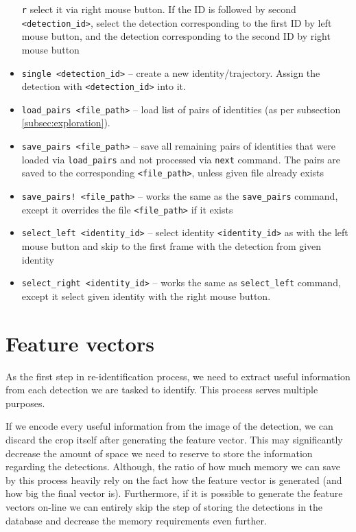 \begin{itemize}
    \verb+r+ select it via right mouse button. If the ID is followed by second
    \verb+<detection_id>+, select the detection corresponding to the first ID by left
    mouse button, and the detection corresponding to the second ID by right mouse button
    \item \verb+single <detection_id>+ -- create a new identity/trajectory. Assign the
    detection with \verb+<detection_id>+ into it.
    \item \verb+load_pairs <file_path>+ -- load list of pairs of identities (as per subsection \ref{subsec:exploration}). 
    \item \verb+save_pairs <file_path>+ -- save all remaining pairs of identities that were loaded via \verb+load_pairs+ and not processed via \verb+next+ command. The
    pairs are saved to the corresponding \verb+<file_path>+, unless given file already
    exists
    \item \verb+save_pairs! <file_path>+ -- works the same as the \verb+save_pairs+
    command, except it overrides the file \verb+<file_path>+ if it exists
    \item \verb+select_left <identity_id>+ -- select identity \verb+<identity_id>+ 
    as with the left mouse button and
    skip to the first frame with the detection from given identity
    \item \verb+select_right <identity_id>+ -- works the same as \verb+select_left+
    command, except it select given identity with the right mouse button.
\end{itemize}

\chapter{Feature vectors}

As the first step in re-identification process, we need to extract useful information
from each detection we are tasked to identify. This process serves multiple purposes.

If we encode every useful information from the image of the detection, we can discard
the crop itself after generating the feature vector. This may significantly decrease
the amount of space we need to reserve to store the information regarding the detections.
Although, the ratio of how much memory we can save by this process heavily rely on
the fact how the feature vector is generated (and how big the final vector is).
Furthermore, if it is possible to generate the feature vectors on-line we can entirely
skip the step of storing the detections in the database and decrease the memory
requirements even further.

